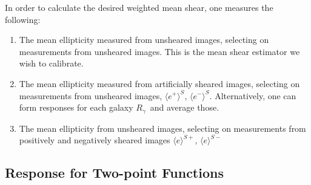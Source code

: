 \documentclass[iop, twocolappendix, appendixfloats, numberedappendix, apj]{emulateapj}
\newcommand{\vest}{\mbox{\boldmath $e$}}
\newcommand{\mcalRpsf}{$R^{p}$}
\newcommand{\mcalRg}{\mbox{\boldmath $R_\gamma$}}
\begin{document}






In order to calculate the desired weighted mean shear, one measures the
following:
\begin{enumerate}
	\item The mean ellipticity measured from unsheared images, selecting on
        measurements from unsheared images.   This is the mean shear estimator
		we wish to calibrate.
	\item The mean ellipticity measured from artificially sheared images, selecting
        on measurements from unsheared images,  $\langle e^+ \rangle^S$, $\langle e^- \rangle^S$. Alternatively, 
        one can form responses for each galaxy \mcalRg\ and average those.
    \item The mean ellipticity from unsheared images, selecting on measurements
        from positively and negatively sheared images $\langle e \rangle^{S+}$, $\langle e \rangle^{S-}$
\end{enumerate}





\subsection{Response for Two-point Functions} \label{sec:Rtwopt}
\end{document}
